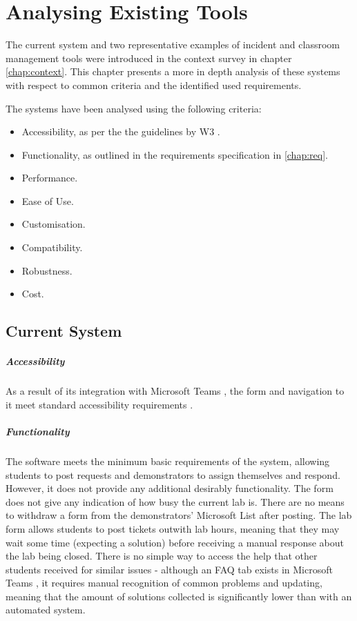 \chapter{Analysing Existing Tools}\label{chap:existingtools}

The current system and two representative examples of incident and classroom management tools were introduced in the context survey in chapter \ref{chap:context}. This chapter presents a more in depth analysis of these systems with respect to common criteria and the identified used requirements.

The systems have been analysed using the following criteria:

\begin{itemize}
    \item Accessibility, as per the the guidelines by W3 \cite{wcag}.
    \item Functionality, as outlined in the requirements specification in \autoref{chap:req}.
    \item Performance.
    \item Ease of Use.
    \item Customisation.
    \item Compatibility.
    \item Robustness.
    \item Cost.
\end{itemize}

\section{Current System}

\paragraph{Accessibility}
As a result of its integration with Microsoft Teams \cite{teams}, the form and navigation to it meet standard accessibility requirements \cite{formaccess} \cite{teamsaccess}. 

\paragraph{Functionality}

The software meets the minimum basic requirements of the system, allowing students to post requests and demonstrators to assign themselves and respond. However, it does not provide any additional desirably functionality. The form does not give any indication of how busy the current lab is. There are no means to withdraw a form from the demonstrators' Microsoft List after posting. The lab form allows students to post tickets outwith lab hours, meaning that they may wait some time (expecting a solution) before receiving a manual response about the lab being closed. There is no simple way to access the help that other students received for similar issues - although an FAQ tab exists in Microsoft Teams \cite{teams}, it requires manual recognition of common problems and updating, meaning that the amount of solutions collected is significantly lower than with an automated system. 

